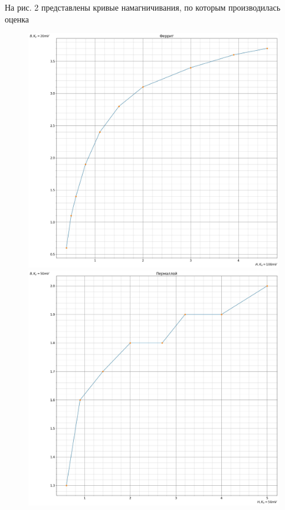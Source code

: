\documentclass[12pt, letterpaper, oneside]{article}
\begin{document}
На рис. 2 представлены кривые намагничивания, по которым производилась оценка
\begin{figure}[H]
\includegraphics[scale = 0.15]{1.jpg}
\includegraphics[scale = 0.15]{2.jpg}\\
\begin{center}

\end{center}
\end{figure}
\end{document}
